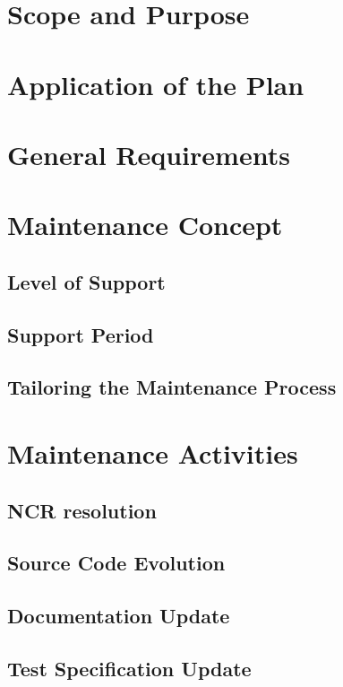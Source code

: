 \section{Scope and Purpose}

\section{Application of the Plan}

\section{General Requirements}

\section{Maintenance Concept}

\subsection{Level of Support}

\subsection{Support Period}

\subsection{Tailoring the Maintenance Process}

\section{Maintenance Activities}

\subsection{NCR resolution}
\subsection{Source Code Evolution}
\subsection{Documentation Update}
\subsection{Test Specification Update}

